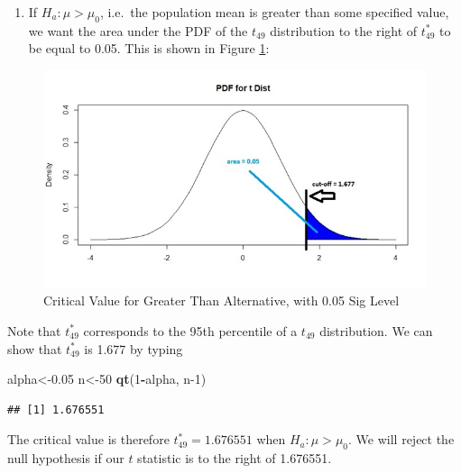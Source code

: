 \documentclass[
]{book}
\newenvironment{Shaded}{\begin{snugshade}}{\end{snugshade}}
\newcommand{\DecValTok}[1]{\textcolor[rgb]{0.00,0.00,0.81}{#1}}
\newcommand{\FloatTok}[1]{\textcolor[rgb]{0.00,0.00,0.81}{#1}}
\newcommand{\FunctionTok}[1]{\textcolor[rgb]{0.13,0.29,0.53}{\textbf{#1}}}
\newcommand{\NormalTok}[1]{#1}
\newcommand{\OtherTok}[1]{\textcolor[rgb]{0.56,0.35,0.01}{#1}}
\newcommand{\SpecialCharTok}[1]{\textcolor[rgb]{0.81,0.36,0.00}{\textbf{#1}}}
\providecommand{\tightlist}{%
  \setlength{\itemsep}{0pt}\setlength{\parskip}{0pt}}
\begin{document}
\begin{enumerate}
\def\labelenumi{\arabic{enumi}.}
\setcounter{enumi}{1}
\tightlist
\item
  If \(H_a: \mu > \mu_0\), i.e.~the population mean is greater than some specified value, we want the area under the PDF of the \(t_{49}\) distribution to the right of \(t_{49}^*\) to be equal to 0.05. This is shown in Figure \ref{fig:9-critgreater}:
\end{enumerate}

\begin{figure}
\centering
\includegraphics{images/09-crit_greater.jpeg}
\caption{\label{fig:9-critgreater}Critical Value for Greater Than Alternative, with 0.05 Sig Level}
\end{figure}

Note that \(t_{49}^*\) corresponds to the 95th percentile of a \(t_{49}\) distribution. We can show that \(t_{49}^*\) is 1.677 by typing

\begin{Shaded}
\begin{Highlighting}[]
\NormalTok{alpha}\OtherTok{\textless{}{-}}\FloatTok{0.05}
\NormalTok{n}\OtherTok{\textless{}{-}}\DecValTok{50}
\FunctionTok{qt}\NormalTok{(}\DecValTok{1}\SpecialCharTok{{-}}\NormalTok{alpha, n}\DecValTok{{-}1}\NormalTok{)}
\end{Highlighting}
\end{Shaded}

\begin{verbatim}
## [1] 1.676551
\end{verbatim}

The critical value is therefore \(t_{49}^* = 1.676551\) when \(H_a: \mu > \mu_0\). We will reject the null hypothesis if our \(t\) statistic is to the right of 1.676551.
\end{document}
